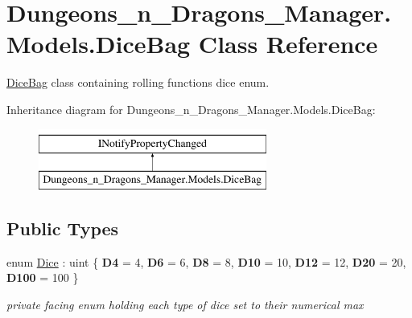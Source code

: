 \hypertarget{class_dungeons__n___dragons___manager_1_1_models_1_1_dice_bag}{}\section{Dungeons\+\_\+n\+\_\+\+Dragons\+\_\+\+Manager.\+Models.\+Dice\+Bag Class Reference}
\label{class_dungeons__n___dragons___manager_1_1_models_1_1_dice_bag}


\mbox{\hyperlink{class_dungeons__n___dragons___manager_1_1_models_1_1_dice_bag}{Dice\+Bag}} class containing rolling functions dice enum.  


Inheritance diagram for Dungeons\+\_\+n\+\_\+\+Dragons\+\_\+\+Manager.\+Models.\+Dice\+Bag\+:\begin{figure}[H]
\begin{center}
\leavevmode
\includegraphics[height=2.000000cm]{class_dungeons__n___dragons___manager_1_1_models_1_1_dice_bag}
\end{center}
\end{figure}
\subsection*{Public Types}
\begin{DoxyCompactItemize}
\item 
enum \mbox{\hyperlink{class_dungeons__n___dragons___manager_1_1_models_1_1_dice_bag_a6217970288bbbf366900fb850594603a}{Dice}} \+: uint \{ \newline
{\bfseries D4} = 4, 
{\bfseries D6} = 6, 
{\bfseries D8} = 8, 
{\bfseries D10} = 10, 
\newline
{\bfseries D12} = 12, 
{\bfseries D20} = 20, 
{\bfseries D100} = 100
 \}
\begin{DoxyCompactList}\small\item\em private facing enum holding each type of dice set to their numerical max \end{DoxyCompactList}\end{DoxyCompactItemize}
